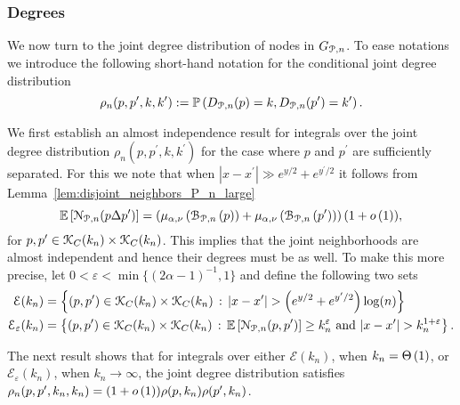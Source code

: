 \subsubsection*{Degrees}

We now turn to the joint degree distribution of nodes in $G_{{\mathcal P},n}$. To ease notations we introduce the following short-hand notation for the conditional joint degree distribution
\[
	\rho_n(p,p^\prime,k,k^\prime) 
	:= \mathbb{P}\left(D_{{\mathcal P},n}(p) = k, D_{{\mathcal P},n}(p^\prime) = k^\prime\right).
\]

We first establish an almost independence result for integrals over the joint degree distribution $\rho_{n}(p,p^\prime,k,k^\prime)$ for the case where  $p$ and $p^\prime$ are sufficiently separated. For this we note that when $|x - x^\prime| \gg e^{y/2} + e^{y^\prime/2}$ it follows from Lemma~\ref{lem:disjoint_neighbors_P_n_large}
\[
	\mathbb{E}\left[{\mathcal N}_{{\mathcal P},n}(p \Delta p^\prime)\right] = \left(\mu_{\alpha,\nu}\left({\mathcal B}_{{\mathcal P},n}\left(p\right)\right) + \mu_{\alpha,\nu}\left({\mathcal B}_{{\mathcal P},n}\left(p^\prime\right)\right)\right)(1 + o\left(1\right)),
\] 
for $p, p^\prime \in {\mathcal K}_{C}(k_n) \times {\mathcal K}_{C}(k_n)$. This implies that the joint neighborhoods are almost independent and hence their degrees must be as well. To make this more precise, let $0 < \varepsilon < \min\{(2\alpha - 1)^{-1},1\}$ and define the following two sets
\begin{align}
	\mathcal{E}(k_n) &= \left\{(p,p^\prime) \in {\mathcal K}_C(k_n) \times {\mathcal K}_C(k_n) 
			\, : \, |x - x^\prime| > \left(e^{y/2} + e^{y^\prime/2}\right) \log(n)
		\right\} \label{eq:def_joint_degree_set_E_constant_k} \\
	\mathcal{E}_{\varepsilon}(k_n) &= \left\{(p,p^\prime) \in {\mathcal K}_C(k_n) \times {\mathcal K}_C(k_n) 
		\, : \, \mathbb{E}\left[{\mathcal N}_{{\mathcal P},n}(p, p^\prime)\right] \ge k_n^{\varepsilon} \text{ and } |x - x^\prime| > k_n^{1 + \varepsilon} \right\}. \label{eq:def_joint_degree_set_E_growing_k}
\end{align}

The next result shows that for integrals over either $\mathcal{E}(k_n)$, when $k_n = \Theta\left(1\right)$, or $\mathcal{E}_{\varepsilon}(k_n)$, when $k_n \to \infty$, the joint degree distribution satisfies $\rho_n(p,p^\prime,k_n,k_n) = (1 + o\left(1\right))\rho(p,k_n)\rho(p^\prime,k_n)$.

